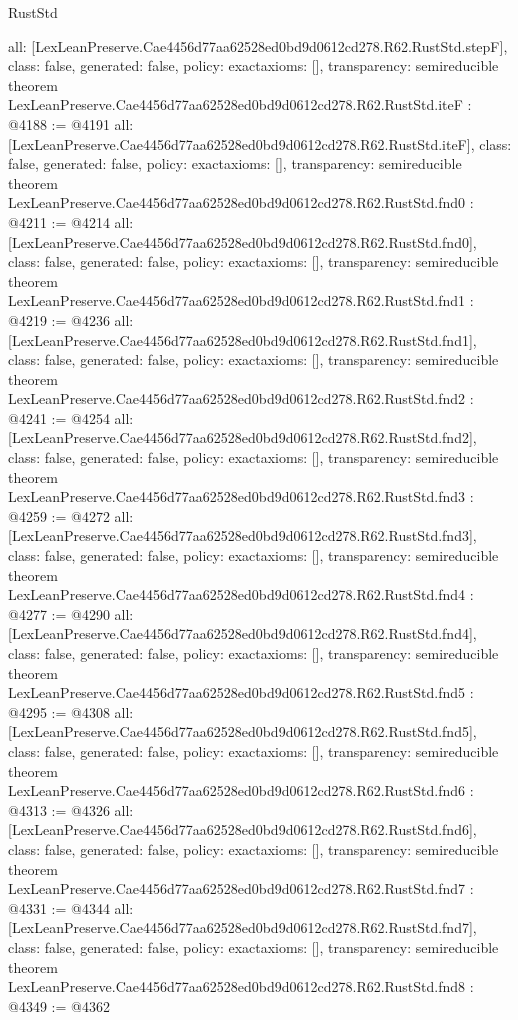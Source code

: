 \begin{lexlean}{RustStd}
\begin{coremodule}
{  all: [LexLeanPreserve.Cae4456d77aa62528ed0bd9d0612cd278.R62.RustStd.stepF],
  class: false,
  generated: false,
  policy: exact{axioms: []},
  transparency: semireducible
}
theorem LexLeanPreserve.Cae4456d77aa62528ed0bd9d0612cd278.R62.RustStd.iteF : @4188 := @4191 {
  all: [LexLeanPreserve.Cae4456d77aa62528ed0bd9d0612cd278.R62.RustStd.iteF],
  class: false,
  generated: false,
  policy: exact{axioms: []},
  transparency: semireducible
}
theorem LexLeanPreserve.Cae4456d77aa62528ed0bd9d0612cd278.R62.RustStd.fnd0 : @4211 := @4214 {
  all: [LexLeanPreserve.Cae4456d77aa62528ed0bd9d0612cd278.R62.RustStd.fnd0],
  class: false,
  generated: false,
  policy: exact{axioms: []},
  transparency: semireducible
}
theorem LexLeanPreserve.Cae4456d77aa62528ed0bd9d0612cd278.R62.RustStd.fnd1 : @4219 := @4236 {
  all: [LexLeanPreserve.Cae4456d77aa62528ed0bd9d0612cd278.R62.RustStd.fnd1],
  class: false,
  generated: false,
  policy: exact{axioms: []},
  transparency: semireducible
}
theorem LexLeanPreserve.Cae4456d77aa62528ed0bd9d0612cd278.R62.RustStd.fnd2 : @4241 := @4254 {
  all: [LexLeanPreserve.Cae4456d77aa62528ed0bd9d0612cd278.R62.RustStd.fnd2],
  class: false,
  generated: false,
  policy: exact{axioms: []},
  transparency: semireducible
}
theorem LexLeanPreserve.Cae4456d77aa62528ed0bd9d0612cd278.R62.RustStd.fnd3 : @4259 := @4272 {
  all: [LexLeanPreserve.Cae4456d77aa62528ed0bd9d0612cd278.R62.RustStd.fnd3],
  class: false,
  generated: false,
  policy: exact{axioms: []},
  transparency: semireducible
}
theorem LexLeanPreserve.Cae4456d77aa62528ed0bd9d0612cd278.R62.RustStd.fnd4 : @4277 := @4290 {
  all: [LexLeanPreserve.Cae4456d77aa62528ed0bd9d0612cd278.R62.RustStd.fnd4],
  class: false,
  generated: false,
  policy: exact{axioms: []},
  transparency: semireducible
}
theorem LexLeanPreserve.Cae4456d77aa62528ed0bd9d0612cd278.R62.RustStd.fnd5 : @4295 := @4308 {
  all: [LexLeanPreserve.Cae4456d77aa62528ed0bd9d0612cd278.R62.RustStd.fnd5],
  class: false,
  generated: false,
  policy: exact{axioms: []},
  transparency: semireducible
}
theorem LexLeanPreserve.Cae4456d77aa62528ed0bd9d0612cd278.R62.RustStd.fnd6 : @4313 := @4326 {
  all: [LexLeanPreserve.Cae4456d77aa62528ed0bd9d0612cd278.R62.RustStd.fnd6],
  class: false,
  generated: false,
  policy: exact{axioms: []},
  transparency: semireducible
}
theorem LexLeanPreserve.Cae4456d77aa62528ed0bd9d0612cd278.R62.RustStd.fnd7 : @4331 := @4344 {
  all: [LexLeanPreserve.Cae4456d77aa62528ed0bd9d0612cd278.R62.RustStd.fnd7],
  class: false,
  generated: false,
  policy: exact{axioms: []},
  transparency: semireducible
}
theorem LexLeanPreserve.Cae4456d77aa62528ed0bd9d0612cd278.R62.RustStd.fnd8 : @4349 := @4362 {
}
\end{coremodule}
\end{lexlean}

